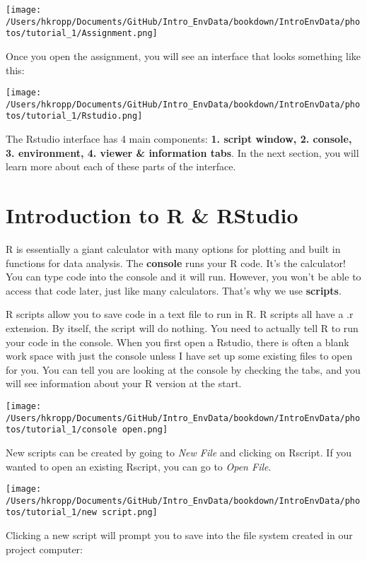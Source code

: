 \documentclass[
]{book}
\theoremstyle{definition}
\theoremstyle{definition}
\theoremstyle{definition}
\theoremstyle{definition}
\theoremstyle{remark}
\begin{document}
\texttt{[image: /Users/hkropp/Documents/GitHub/Intro\_EnvData/bookdown/IntroEnvData/photos/tutorial\_1/Assignment.png]}

Once you open the assignment, you will see an interface that looks something like this:

\texttt{[image: /Users/hkropp/Documents/GitHub/Intro\_EnvData/bookdown/IntroEnvData/photos/tutorial\_1/Rstudio.png]}

The Rstudio interface has 4 main components: \textbf{1. script window, 2. console, 3. environment, 4. viewer \& information tabs}. In the next section, you will learn more about each of these parts of the interface.

\hypertarget{introduction-to-r-rstudio-1}{%
\section{Introduction to R \& RStudio}\label{introduction-to-r-rstudio-1}}

R is essentially a giant calculator with many options for plotting and built in functions for data analysis. The \textbf{console} runs your R code. It's the calculator! You can type code into the console and it will run. However, you won't be able to access that code later, just like many calculators. That's why we use \textbf{scripts}.

R scripts allow you to save code in a text file to run in R. R scripts all have a .r extension. By itself, the script will do nothing. You need to actually tell R to run your code in the console. When you first open a Rstudio, there is often a blank work space with just the console unless I have set up some existing files to open for you. You can tell you are looking at the console by checking the tabs, and you will see information about your R version at the start.

\texttt{[image: /Users/hkropp/Documents/GitHub/Intro\_EnvData/bookdown/IntroEnvData/photos/tutorial\_1/console open.png]}

New scripts can be created by going to \emph{New File} and clicking on Rscript. If you wanted to open an existing Rscript, you can go to \emph{Open File}.

\texttt{[image: /Users/hkropp/Documents/GitHub/Intro\_EnvData/bookdown/IntroEnvData/photos/tutorial\_1/new script.png]}

Clicking a new script will prompt you to save into the file system created in our project computer:
\end{document}

